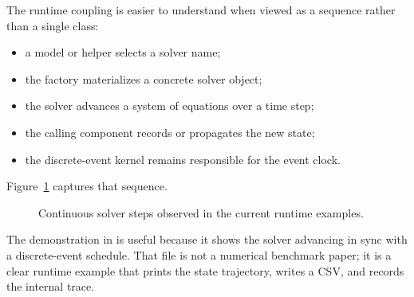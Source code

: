 The runtime coupling is easier to understand when viewed as a sequence rather
than a single class:
\begin{itemize}
\item a model or helper selects a solver name;
\item the factory materializes a concrete solver object;
\item the solver advances a system of equations over a time step;
\item the calling component records or propagates the new state;
\item the discrete-event kernel remains responsible for the event clock.
\end{itemize}

Figure~\ref{fig:continuous-solver-steps} captures that sequence.

\begin{figure}[htbp]
\centering
\caption{Continuous solver steps observed in the current runtime examples.}
\label{fig:continuous-solver-steps}
\end{figure}

The demonstration in  is useful
because it shows the solver advancing in sync with a discrete-event schedule.
That file is not a numerical benchmark paper; it is a clear runtime example
that prints the state trajectory, writes a CSV, and records the internal trace.

